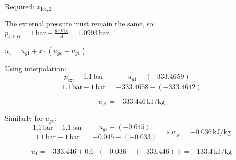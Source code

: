 \( \text{Required: } x_{\text{Ice},2} \)  

The external pressure must remain the same, so:  
\( p_{4,\text{EW}} = 1 \, \text{bar} + \frac{g \cdot m_K}{A} = 1.0993 \, \text{bar} \)  

\( u_1 = u_{g1} + x \cdot (u_{ge} - u_{g1}) \)  

Using interpolation:  
\[
\frac{p_{\text{ext}} - 1.1 \, \text{bar}}{1.1 \, \text{bar} - 1 \, \text{bar}} = \frac{u_{g1} - (-333.4659)}{-333.4658 - (-333.4642)}
\]  

\[
u_{g1} = -333.446 \, \text{kJ/kg}
\]  

Similarly for \( u_{ge} \):  
\[
\frac{1.1 \, \text{bar} - 1.1 \, \text{bar}}{1.1 \, \text{bar} - 1 \, \text{bar}} = \frac{u_{ge} - (-0.045)}{-0.045 - (-0.033)} \implies u_{ge} = -0.036 \, \text{kJ/kg}
\]  

\[
u_1 = -333.446 + 0.6 \cdot (-0.036 - (-333.446)) = -133.4 \, \text{kJ/kg}
\]